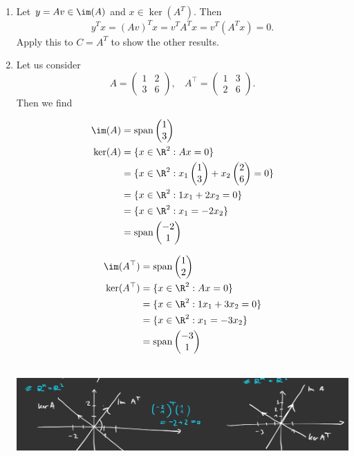\begin{enumerate}
	\item Let $y = Av \in \im(A)$ and $x \in \ker(A^T)$. Then $$y^Tx = (Av)^Tx = v^TA^Tx = v^T(A^Tx)= 0.$$ 
Apply this to $C = A^T$ to show the other results.
\item  		Let us consider
$$A = \begin{pmatrix}1&2\\3&6\end{pmatrix}	,~~~~A^\top= \begin{pmatrix}1&3\\2&6\end{pmatrix}.$$
	Then we find\\
	\begin{minipage}[t]{0.48\textwidth} \small
		\begin{align*}
		\im(A) &= \text{span} \begin{pmatrix}1\\3\end{pmatrix}\\
		\ker(A) &= \{x\in\R^2: Ax = 0\}\\
		&= \{x\in\R^2:  x_1\begin{pmatrix}1\\3\end{pmatrix} +  x_2\begin{pmatrix}2\\6\end{pmatrix} = 0\} \\
		&= \{x\in\R^2: 1x_1 + 2x_2 = 0\} \\
		&= \{x\in\R^2: x_1 = - 2x_2\} \\
		&= \text{span} \begin{pmatrix}-2\\1\end{pmatrix}
		\end{align*}
	\end{minipage}
	\begin{minipage}[t]{0.48\textwidth} \small
		\begin{align*}
		\im(A^\top) &= \text{span} \begin{pmatrix}1\\2\end{pmatrix}\\
		\ker(A^\top) &= \{x\in\R^2: Ax = 0\}\\
		&= \{x\in\R^2: 1x_1 + 3x_2 = 0\}\\
		&= \{x\in\R^2:  x_1 = - 3x_2 \}\\
		&= \text{span} \begin{pmatrix}-3\\1\end{pmatrix}
		\end{align*}
	\end{minipage}
	~\\
	\includegraphics[width=0.9\linewidth]{ex-bigPicture-LA}
\end{enumerate}
